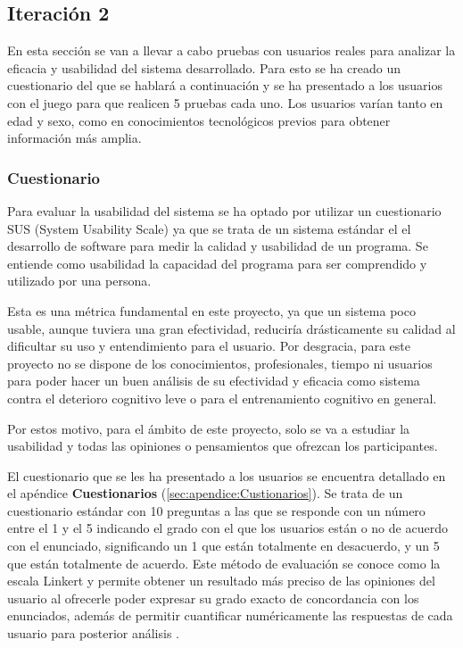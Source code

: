 

\subsection{Iteración 2}

En esta sección se van a llevar a cabo pruebas con usuarios reales para analizar la eficacia y usabilidad del sistema desarrollado. Para esto se ha creado un cuestionario del que se hablará a continuación y se ha presentado a los usuarios con el juego para que realicen 5 pruebas cada uno. Los usuarios varían tanto en edad y sexo, como en conocimientos tecnológicos previos para obtener información más amplia.



\subsubsection{Cuestionario}

Para evaluar la usabilidad del sistema se ha optado por utilizar un cuestionario SUS (System Usability Scale) ya que se trata de un sistema estándar el el desarrollo de software para medir la calidad y usabilidad de un programa. Se entiende como usabilidad la capacidad del programa para ser comprendido y utilizado por una persona.

Esta es una métrica fundamental en este proyecto, ya que un sistema poco usable, aunque tuviera una gran efectividad, reduciría drásticamente su calidad al dificultar su uso y entendimiento para el usuario. Por desgracia, para este proyecto no se dispone de los conocimientos, profesionales, tiempo ni usuarios para poder hacer un buen análisis de su efectividad y eficacia como sistema contra el deterioro cognitivo leve o para el entrenamiento cognitivo en general.

Por estos motivo, para el ámbito de este proyecto, solo se va a estudiar la usabilidad y todas las opiniones o pensamientos que ofrezcan los participantes.

El cuestionario que se les ha presentado a los usuarios se encuentra detallado en el apéndice \textbf{Cuestionarios} (\ref{sec:apendice:Custionarios}). Se trata de un cuestionario estándar con 10 preguntas a las que se responde con un número entre el 1 y el 5 indicando el grado con el que los usuarios están o no de acuerdo con el enunciado, significando un 1 que están totalmente en desacuerdo, y un 5 que están totalmente de acuerdo. Este método de evaluación se conoce como la escala Linkert y permite obtener un resultado más preciso de las opiniones del usuario al ofrecerle poder expresar su grado exacto de concordancia con los enunciados, además de permitir cuantificar numéricamente las respuestas de cada usuario para posterior análisis \cite{DES_5_2_linkert}.


